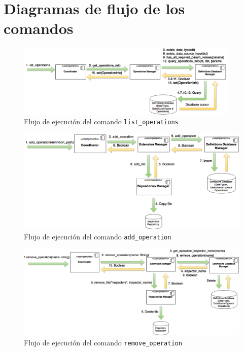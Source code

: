 \chapter{Diagramas de flujo de los comandos}
\label{diagramasFlujo}
\begin{figure}[H]
    \begin{center}
        \includegraphics[width=0.95\textwidth]{figures/list_operations}
        \caption{Flujo de ejecución del comando \texttt{list\_operations}}
    \end{center}
\end{figure}

\begin{figure}[H]
    \begin{center}
        \includegraphics[width=\textwidth]{figures/add_operation}
        \caption{Flujo de ejecución del comando \texttt{add\_operation}}
    \end{center}
\end{figure}

\begin{figure}[H]
    \begin{center}
        \includegraphics[width=\textwidth]{figures/remove_operation}
        \caption{Flujo de ejecución del comando \texttt{remove\_operation}}
    \end{center}
\end{figure}

